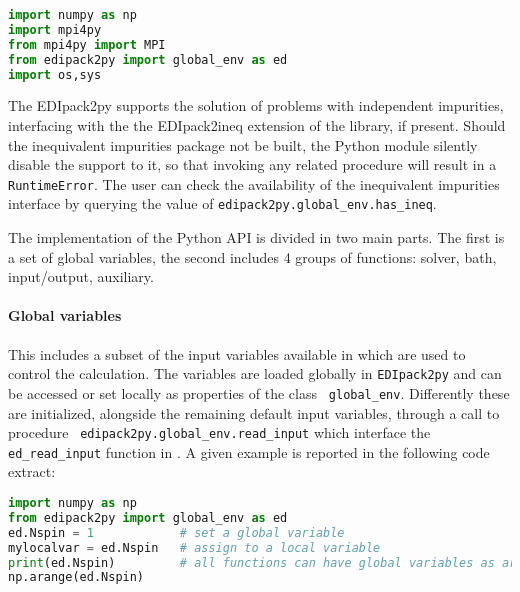 \documentclass[edipack2.tex]{subfiles}
\begin{document}
\begin{lstlisting}[language=python,  frame=lines]
import numpy as np
import mpi4py
from mpi4py import MPI
from edipack2py import global_env as ed
import os,sys
\end{lstlisting}

The EDIpack2py supports the solution of problems with independent
impurities, interfacing with the the EDIpack2ineq extension of the
library, if present. Should the inequivalent impurities package not be
built, the Python module silently disable the support to it, so that
invoking any related procedure  will result in a {\tt RuntimeError}.
The user can check the availability of the inequivalent impurities
interface by querying the value of  {\tt edipack2py.global\_env.has\_ineq}.

The implementation of the Python API is divided in two main parts. The
first is a set of global variables, the second includes 4 groups of
functions: solver, bath, input/output, auxiliary. 

\paragraph{{\bf Global variables}}
This includes a subset of the input variables available in \NAME which
are used to control the calculation.
The variables are loaded globally in {\tt EDIpack2py} and can be accessed
or set locally as properties of the class {\tt
  global\_env}. Differently these are initialized, alongside the remaining
default input variables, through a call to procedure {\tt
  edipack2py.global\_env.read\_input} which interface the {\tt
  ed\_read\_input} function in \NAME. 
A given example is reported in the following code extract:

\begin{lstlisting}[language=python,  frame=lines]
import numpy as np
from edipack2py import global_env as ed
ed.Nspin = 1            # set a global variable
mylocalvar = ed.Nspin   # assign to a local variable
print(ed.Nspin)         # all functions can have global variables as arguments
np.arange(ed.Nspin)
\end{lstlisting}
\end{document}
